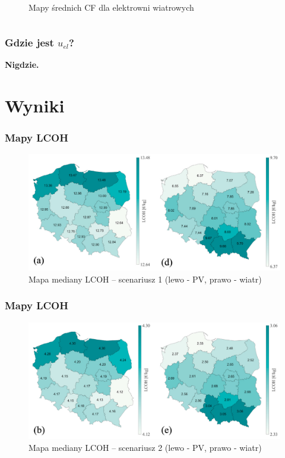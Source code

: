 \documentclass{beamer}
\begin{document}
\begin{frame}
\begin{columns}
\begin{column}{0.5\textwidth}
\begin{figure}
\begin{center}
				\end{center}
				\caption{Mapy średnich CF dla elektrowni wiatrowych}
			\end{figure}
		\end{column}
	\end{columns}
\end{frame}

\begin{frame}
	\frametitle{Gdzie jest $u_{el}$?}
	\pause
	\textbf{Nigdzie.}
\end{frame}

\section{Wyniki}

\begin{frame}
	\frametitle{Mapy LCOH}
	\begin{figure}
		\begin{center}
			\includegraphics[width=\textwidth]{mmc-results-maps-1.png}
		\end{center}
		\caption{Mapa mediany LCOH -- scenariusz 1 (lewo - PV, prawo - wiatr)}
	\end{figure}
\end{frame}

\begin{frame}[noframenumbering]
	\frametitle{Mapy LCOH}
	\begin{figure}
		\begin{center}
			\includegraphics[width=\textwidth]{mmc-results-maps-2.png}
		\end{center}
		\caption{Mapa mediany LCOH -- scenariusz 2 (lewo - PV, prawo - wiatr)}
	\end{figure}
\end{frame}
\end{document}
